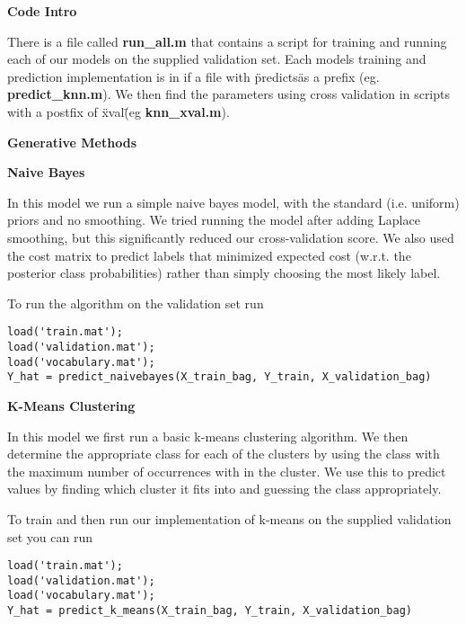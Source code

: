 \documentclass[12pt, a4paper]{article}
\title{}
\author{Tyler Altenhofen, Rohan Alur}
\date{}
\begin{document}
\maketitle

{\Large\textbf{Code Intro}}

There is a file called \textbf{run\_all.m} that contains a script for training and running each of our models on the supplied validation set. Each models training and prediction implementation is in if a file with \"predicts\" as a prefix (eg. \textbf{predict\_knn.m}). We then find the parameters using cross validation in scripts with a postfix of \"xval\" (eg \textbf{knn\_xval.m}).

\vspace{5mm}

{\Large\textbf{Generative Methods}}

\vspace{3mm}

{\large\textbf{Naive Bayes}}

\vspace{3mm}
In this model we run a simple naive bayes model, with the standard (i.e. uniform) priors and no smoothing. We tried running the model after adding Laplace smoothing, but this significantly reduced our cross-validation score. We also used the cost matrix to predict labels that minimized expected cost (w.r.t. the posterior class probabilities) rather than simply choosing the most likely label. 

To run the algorithm on the validation set run
\begin{verbatim}
load('train.mat');
load('validation.mat');
load('vocabulary.mat');
Y_hat = predict_naivebayes(X_train_bag, Y_train, X_validation_bag)
\end{verbatim}

\vspace{3mm}
{\large\textbf{K-Means Clustering}}

\vspace{3mm}

In this model we first run a basic k-means clustering algorithm. We then determine the appropriate class for each of the clusters by using the class with the maximum number of occurrences with in the cluster. We use this to predict values by finding which cluster it fits into and guessing the class appropriately. 

To train and then run our implementation of k-means on the supplied validation set you can run 
\begin{verbatim}
load('train.mat');
load('validation.mat');
load('vocabulary.mat');
Y_hat = predict_k_means(X_train_bag, Y_train, X_validation_bag)
\end{verbatim}
\end{document}
